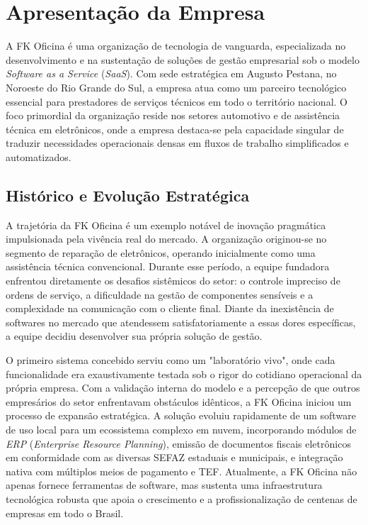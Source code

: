 
\chapter{Apresentação da Empresa}
\label{ch:apresentacao-empresa}

A FK Oficina é uma organização de tecnologia de vanguarda, especializada no desenvolvimento e na sustentação de soluções de gestão empresarial sob o modelo \textit{Software as a Service} (\textit{SaaS}). Com sede estratégica em Augusto Pestana, no Noroeste do Rio Grande do Sul, a empresa atua como um parceiro tecnológico essencial para prestadores de serviços técnicos em todo o território nacional. O foco primordial da organização reside nos setores automotivo e de assistência técnica em eletrônicos, onde a empresa destaca-se pela capacidade singular de traduzir necessidades operacionais densas em fluxos de trabalho simplificados e automatizados.

\section{Histórico e Evolução Estratégica}
\label{sec:historico}

A trajetória da FK Oficina é um exemplo notável de inovação pragmática impulsionada pela vivência real do mercado. A organização originou-se no segmento de reparação de eletrônicos, operando inicialmente como uma assistência técnica convencional. Durante esse período, a equipe fundadora enfrentou diretamente os desafios sistêmicos do setor: o controle impreciso de ordens de serviço, a dificuldade na gestão de componentes sensíveis e a complexidade na comunicação com o cliente final. Diante da inexistência de softwares no mercado que atendessem satisfatoriamente a essas dores específicas, a equipe decidiu desenvolver sua própria solução de gestão.

O primeiro sistema concebido serviu como um "laboratório vivo", onde cada funcionalidade era exaustivamente testada sob o rigor do cotidiano operacional da própria empresa. Com a validação interna do modelo e a percepção de que outros empresários do setor enfrentavam obstáculos idênticos, a FK Oficina iniciou um processo de expansão estratégica. A solução evoluiu rapidamente de um software de uso local para um ecossistema complexo em nuvem, incorporando módulos de \textit{ERP} (\textit{Enterprise Resource Planning}), emissão de documentos fiscais eletrônicos em conformidade com as diversas SEFAZ estaduais e municipais, e integração nativa com múltiplos meios de pagamento e TEF. Atualmente, a FK Oficina não apenas fornece ferramentas de software, mas sustenta uma infraestrutura tecnológica robusta que apoia o crescimento e a profissionalização de centenas de empresas em todo o Brasil.

